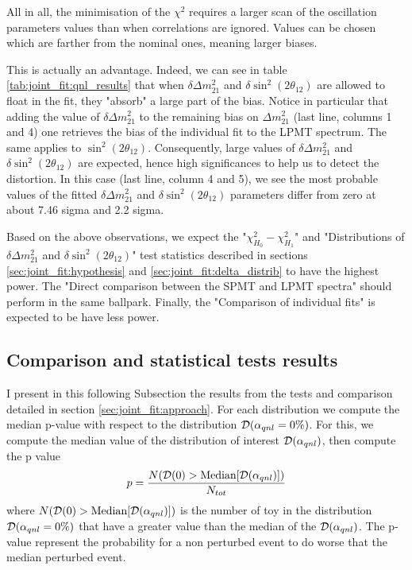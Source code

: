 \documentclass[../main.tex]{subfiles}
\begin{document}
All in all, the minimisation of the $\chi^2$ requires a larger scan of the oscillation parameters values than when correlations are ignored. Values can be chosen which are farther from the nominal ones, meaning larger biases.

This is actually an advantage. Indeed, we can see in table \ref{tab:joint_fit:qnl_results} that when $\delta \Delta m^2_{21}$ and $\delta \sin^2(2 \theta_{12})$ are allowed to float in the fit, they "absorb" a large part of the bias. Notice in particular that adding the value of $\delta \Delta m^2_{21}$ to the remaining bias on $\Delta m^2_{21}$ (last line, columns 1 and 4) one retrieves the bias of the individual fit to the LPMT spectrum. The same applies to $\sin^2(2\theta_{12})$. Consequently, large values of $\delta \Delta m^2_{21}$ and  $\delta \sin^2(2 \theta_{12})$ are expected, hence high significances to help us to detect the distortion. In this case (last line, column 4 and 5), we see the most probable values of the fitted $\delta \Delta m^2_{21}$ and $\delta \sin^2(2 \theta_{12})$ parameters differ from zero at about 7.46 sigma and 2.2 sigma.

Based on the above observations, we expect the "$\chi^2_{H_0}-\chi^2_{H_1}$" and "Distributions of $\delta \Delta m^2_{21}$
and  $\delta \sin^2(2 \theta_{12})$" test statistics described in sections \ref{sec:joint_fit:hypothesis} and \ref{sec:joint_fit:delta_distrib} to have the highest power.
The "Direct comparison between the SPMT and LPMT spectra" should perform in the same ballpark. Finally, the "Comparison of individual fits" is expected to be have less power.

\subsection{Comparison and statistical tests results}

I present in this following Subsection the results from the tests and comparison detailed in section \ref{sec:joint_fit:approach}. For each distribution we compute the median p-value with respect to the distribution ${\cal D}(\alpha_{qnl} = 0\%)$. For this, we compute the median value of the distribution of interest ${\cal D}(\alpha_{qnl})$, then compute the p value
\begin{equation}
  p = \frac{N({\cal D}(0) > \text{Median}[{\cal D}(\alpha_{qnl})])}{N_{tot}}
\end{equation}
where $N({\cal D}(0) > \text{Median}[{\cal D}(\alpha_{qnl})])$ is the number of toy in the distribution ${\cal D}(\alpha_{qnl} = 0\%)$ that have a greater value than the median of the ${\cal D}(\alpha_{qnl})$. The p-value represent the probability for a non perturbed event to do worse that the median perturbed event.
\end{document}
